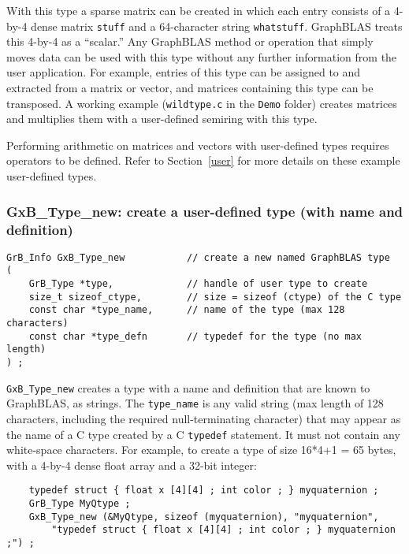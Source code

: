 \documentclass[12pt]{article}
\begin{document}
{With this type a sparse matrix can be created in which each entry consists of a
4-by-4 dense matrix \verb'stuff' and a 64-character string \verb'whatstuff'.
GraphBLAS treats this 4-by-4 as a ``scalar.'' Any GraphBLAS method or operation
that simply moves data can be used with this type without any further
information from the user application.  For example, entries of this type can
be assigned to and extracted from a matrix or vector, and matrices containing
this type can be transposed.  A working example (\verb'wildtype.c'
in the \verb'Demo' folder) creates matrices and multiplies them with
a user-defined semiring with this type.

Performing arithmetic on matrices and vectors with user-defined types requires
operators to be defined.  Refer to Section~\ref{user} for more details on these
example user-defined types.

\subsubsection{{\sf GxB\_Type\_new:} create a user-defined type (with name and definition)}
\label{type_new_named}

\begin{mdframed}[userdefinedwidth=6in]
{\footnotesize
\begin{verbatim}
GrB_Info GxB_Type_new           // create a new named GraphBLAS type
(
    GrB_Type *type,             // handle of user type to create
    size_t sizeof_ctype,        // size = sizeof (ctype) of the C type
    const char *type_name,      // name of the type (max 128 characters)
    const char *type_defn       // typedef for the type (no max length)
) ;
\end{verbatim}
}\end{mdframed}

\verb'GxB_Type_new' creates a type with a name and definition that are known to
GraphBLAS, as strings.  The \verb'type_name' is any valid string (max length of 128
characters, including the required null-terminating character) that may
appear as the name of a C type created by a C \verb'typedef' statement.  It must
not contain any white-space characters.  For example, to create a type of size
16*4+1 = 65 bytes, with a 4-by-4 dense float array and a 32-bit integer:

    {\footnotesize
    \begin{verbatim}
    typedef struct { float x [4][4] ; int color ; } myquaternion ;
    GrB_Type MyQtype ;
    GxB_Type_new (&MyQtype, sizeof (myquaternion), "myquaternion",
        "typedef struct { float x [4][4] ; int color ; } myquaternion ;") ; \end{verbatim}}

}
\end{document}
